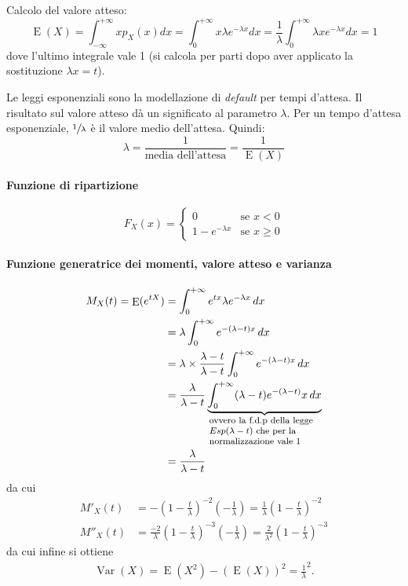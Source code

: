 \documentclass[11pt,a4paper,twoside]{article}
\let\geq\geqslant%
\newcommand\dx{\,dx}
\newcommand{\explain}[2]{\underbrace{#1}_{\parbox{\widthof{\ensuremath{#1}}}{\footnotesize\raggedright #2}}}
\DeclareMathOperator{\Var}{Var}
\DeclareMathOperator{\E}{E}
\begin{document}
Calcolo del valore atteso:
\[
  \E(X) = \int_{-\infty}^{+\infty} x p_X(x) dx = \int_0^{+\infty} x
  \lambda e^{-\lambda x} dx = \frac{1}{\lambda} \int_0^{+\infty}
  \lambda x e^{-\lambda x} dx = 1
\]
dove l'ultimo integrale vale 1 (si calcola per parti dopo aver
applicato la sostituzione \(\lambda x = t\)).

Le leggi esponenziali sono la modellazione di \textit{default} per
tempi d'attesa.  Il risultato sul valore atteso dà un significato al
parametro \(\lambda\). Per un tempo d'attesa esponenziale,
\(\sfrac{1}{\lambda}\) è il valore medio dell'attesa. Quindi:
\[
  \lambda = \frac{1}{\mbox{media dell'attesa}} = \frac{1}{\E(X)}
\]

\paragraph{Funzione di ripartizione}
\[
  F_X(x) = \begin{cases}
    0 &\mbox{se } x < 0 \\
    1-e^{-\lambda x} &\mbox{se } x\geq 0
  \end{cases}
\]

\paragraph{Funzione generatrice dei momenti, valore atteso e varianza}
\begin{align*}
  M_X(t) = \E(e^{tX})
  &= \int_0^{+\infty} e^{tx} \lambda e^{-\lambda x} \dx \\
  &= \lambda \int_0^{+\infty} e^{-(\lambda - t)x} \dx \\
  &= \lambda \times \frac{\lambda -t}{\lambda -t} \int_0^{+\infty} e^{-(\lambda - t)x} \dx \\
  &= \frac{\lambda}{\lambda - t}
    \explain{\int_0^{+\infty} (\lambda -t)e^{-(\lambda -t)}x \dx}
    {ovvero la f.d.p\ della legge \(Esp(\lambda -t)\) che per la normalizzazione vale 1}\\
  &= \frac{\lambda}{\lambda -t}
\end{align*}
da cui
\begin{align*}
  M'_X(t)
  &= - \left( 1 - \frac{t}{\lambda} \right)^{-2}
    \left(-\frac{1}{\lambda}\right) =
    \frac{1}{\lambda} \left( 1 - \frac{t}{\lambda} \right)^{-2} \\
  M''_X(t)
  &= \frac{-2}{\lambda} \left( 1-\frac{t}{\lambda}
    \right)^{-3} \left( -\frac{1}{\lambda} \right) =
    \frac{2}{\lambda^2} \left( 1 - \frac{t}{\lambda} \right)^{-3}
\end{align*}
da cui infine si ottiene
\begin{align*}
  \Var(X) = \E(X^2) - (\E(X))^2 = \frac 1 \lambda^2 .
\end{align*}
\end{document}
